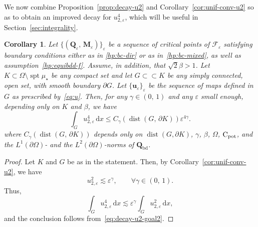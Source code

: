\documentclass[a4paper, 11pt, twoside, leqno]{article}
\newtheorem{corollary}[theorem]{Corollary}
\theoremstyle{definition}              %
\theoremstyle{remark}                  %
\DeclareMathOperator{\dist}{dist}                                   %
\DeclareMathOperator{\spt}{spt}                                     %
\newcommand{\abs}[1]{\left| #1 \right|}                             %
\newcommand{\csubset}{\subset\!\subset}                             %
\renewcommand{\d}{\mathrm{d}}
\newcommand{\Q}{\mathbf{Q}}
\newcommand{\M}{\mathbf{M}}
\renewcommand{\u}{\mathbf{u}}
\newcommand{\F}{\mathscr{F}}
\newcommand{\eps}{\varepsilon}
\newcommand{\Cpot}{{\rm C}_{\rm pot}}
\newcommand{\Qb}{\Q_{\mathrm{bd}}}
\begin{document}
We now combine Proposition~\ref{prop:decay-u2} and Corollary~\ref{cor:unif-conv-u2} 
so as to obtain an improved decay for $u_{2,\eps}^4$, which will be useful 
in Section~\ref{sec:integrality}. 
\begin{corollary}\label{cor:decay-u2^4}
    Let $\{(\Q_\eps,\,\M_\eps)\}_\eps$ be a sequence of critical points of 
	$\F_\eps$ satisfying boundary conditions either as in \eqref{hp:bc-dir} or as 
	in~\eqref{hp:bc-mixed}, as well as assumption~\eqref{hp:equibdd-f}. 
	Assume, in addition, that $\sqrt{2}\beta > 1$.  
    Let $K \subset \Omega \setminus \spt\mu_\star$ be any compact set   
    and let $G \csubset K$ be any simply connected, open set, with smooth boundary $\partial G$.   
    Let $\{\u_\eps\}_\eps$ be the sequence of maps defined in $G$ as prescribed by~\eqref{eq:u}. Then, for any $\gamma \in (0,\,1)$ and any $\eps$ small enough, depending only on $K$ and $\beta$, we have
    \begin{equation}\label{eq:decay-u2-goal3}
        \int_G u_{2,\eps}^4 \,{\d}x 
        \leq C_\gamma(\dist(G,\,\partial K)) \eps^{4\gamma}.
    \end{equation}
    where $C_\gamma(\dist(G,\,\partial K))$ depends only on 
    $\dist(G, \partial K)$, $\gamma$, $\beta$, $\Omega$, $\Cpot$, 
    and the $L^1(\partial\Omega)$- and the $L^2(\partial\Omega)$-norms of $\Qb$. 
\end{corollary}

\begin{proof}
	Let $K$ and $G$ be as in the statement. Then, by Corollary~\ref{cor:unif-conv-u2}, 
	we have 
	\[
		u_{2,\eps}^2 \lesssim \eps^\gamma, \qquad \forall \gamma \in (0,\,1).
	\] 
	Thus, 
	\[
		\int_G u_{2,\eps}^4 \,{\d}x \lesssim \eps^\gamma \int_G u_{2,\eps}^2 \,{\d}x,   
	\]
	and the conclusion follows from~\eqref{eq:decay-u2-goal2}.
\end{proof}

\end{document}
